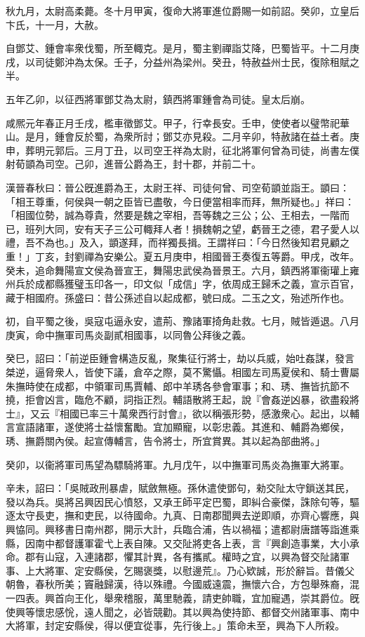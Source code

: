 \begin{pinyinscope}
秋九月，太尉高柔薨。冬十月甲寅，復命大將軍進位爵賜一如前詔。癸卯，立皇后卞氏，十一月，大赦。

自鄧艾、鍾會率衆伐蜀，所至輙克。是月，蜀主劉禪詣艾降，巴蜀皆平。十二月庚戌，以司徒鄭沖為太保。壬子，分益州為梁州。癸丑，特赦益州士民，復除租賦之半。

五年乙卯，以征西將軍鄧艾為太尉，鎮西將軍鍾會為司徒。皇太后崩。

咸熈元年春正月壬戌，檻車徵鄧艾。甲子，行幸長安。壬申，使使者以璧幣祀華山。是月，鍾會反於蜀，為衆所討；鄧艾亦見殺。二月辛卯，特赦諸在益土者。庚申，葬明元郭后。三月丁丑，以司空王祥為太尉，征北將軍何曾為司徒，尚書左僕射荀顗為司空。己卯，進晉公爵為王，封十郡，并前二十。

漢晉春秋曰：晉公旣進爵為王，太尉王祥、司徒何曾、司空荀顗並詣王。顗曰：「相王尊重，何侯與一朝之臣皆已盡敬，今日便當相率而拜，無所疑也。」祥曰：「相國位勢，誠為尊貴，然要是魏之宰相，吾等魏之三公；公、王相去，一階而已，班列大同，安有天子三公可輙拜人者！損魏朝之望，虧晉王之德，君子愛人以禮，吾不為也。」及入，顗遂拜，而祥獨長揖。王謂祥曰：「今日然後知君見顧之重！」丁亥，封劉禪為安樂公。夏五月庚申，相國晉王奏復五等爵。甲戌，改年。癸未，追命舞陽宣文侯為晉宣王，舞陽忠武侯為晉景王。六月，鎮西將軍衞瓘上雍州兵於成都縣獲璧玉印各一，印文似「成信」字，依周成王歸禾之義，宣示百官，藏于相國府。孫盛曰：昔公孫述自以起成都，號曰成。二玉之文，殆述所作也。

初，自平蜀之後，吳寇屯逼永安，遣荊、豫諸軍掎角赴救。七月，賊皆遁退。八月庚寅，命中撫軍司馬炎副貳相國事，以同魯公拜後之義。

癸巳，詔曰：「前逆臣鍾會構造反亂，聚集征行將士，劫以兵威，始吐姦謀，發言桀逆，逼脅衆人，皆使下議，倉卒之際，莫不驚懾。相國左司馬夏侯和、騎士曹屬朱撫時使在成都，中領軍司馬賈輔、郎中羊琇各參會軍事；和、琇、撫皆抗節不撓，拒會凶言，臨危不顧，詞指正烈。輔語散將王起，說『會姦逆凶暴，欲盡殺將士』，又云『相國已率三十萬衆西行討會』，欲以稱張形勢，感激衆心。起出，以輔言宣語諸軍，遂使將士益懷奮勵。宜加顯寵，以彰忠義。其進和、輔爵為鄉侯，琇、撫爵關內侯。起宣傳輔言，告令將士，所宜賞異。其以起為部曲將。」

癸卯，以衞將軍司馬望為驃騎將軍。九月戊午，以中撫軍司馬炎為撫軍大將軍。

辛未，詔曰：「吳賊政刑暴虐，賦斂無極。孫休遣使鄧句，勑交阯太守鎖送其民，發以為兵。吳將呂興因民心憤怒，又承王師平定巴蜀，即糾合豪傑，誅除句等，驅逐太守長吏，撫和吏民，以待國命。九真、日南郡聞興去逆即順，亦齊心響應，與興恊同。興移書日南州郡，開示大計，兵臨合浦，告以禍福；遣都尉唐譜等詣進乘縣，因南中都督護軍霍弋上表自陳。又交阯將吏各上表，言『興創造事業，大小承命。郡有山寇，入連諸郡，懼其計異，各有攜貳。權時之宜，以興為督交阯諸軍事、上大將軍、定安縣侯，乞賜褒獎，以慰邊荒』。乃心欵誠，形於辭旨。昔儀父朝魯，春秋所美；竇融歸漢，待以殊禮。今國威遠震，撫懷六合，方包舉殊裔，混一四表。興首向王化，舉衆稽服，萬里馳義，請吏帥職，宜加寵遇，崇其爵位。旣使興等懷忠感恱，遠人聞之，必皆競勸。其以興為使持節、都督交州諸軍事、南中大將軍，封定安縣侯，得以便宜從事，先行後上。」策命未至，興為下人所殺。


\end{pinyinscope}
